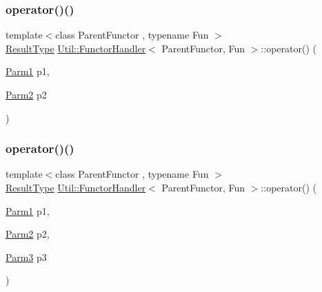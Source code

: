 \mbox{\label{classUtil_1_1FunctorHandler_a464269162477cf2b95690d94ec3fa02c}} 
\subsubsection{\texorpdfstring{operator()()}{operator()()}\hspace{0.1cm}{\footnotesize\ttfamily [9/18]}}
{\footnotesize\ttfamily template$<$class Parent\+Functor , typename Fun $>$ \\
\mbox{\hyperlink{classUtil_1_1FunctorHandler_a036da44b8cc2567704cebd2a20d16c80}{Result\+Type}} \mbox{\hyperlink{classUtil_1_1FunctorHandler}{Util\+::\+Functor\+Handler}}$<$ Parent\+Functor, Fun $>$\+::operator() (\begin{DoxyParamCaption}\item[{\mbox{\hyperlink{classUtil_1_1FunctorHandler_a0a902ba40a0ab746f1c29a81d68ae0db}{Parm1}}}]{p1,  }\item[{\mbox{\hyperlink{classUtil_1_1FunctorHandler_a5fb5374c316f8ac252aa22fcdf7d21a7}{Parm2}}}]{p2 }\end{DoxyParamCaption})\hspace{0.3cm}{\ttfamily [inline]}}

\mbox{\label{classUtil_1_1FunctorHandler_a7f8257ee5864ceec038116184231eb63}} 
\subsubsection{\texorpdfstring{operator()()}{operator()()}\hspace{0.1cm}{\footnotesize\ttfamily [10/18]}}
{\footnotesize\ttfamily template$<$class Parent\+Functor , typename Fun $>$ \\
\mbox{\hyperlink{classUtil_1_1FunctorHandler_a036da44b8cc2567704cebd2a20d16c80}{Result\+Type}} \mbox{\hyperlink{classUtil_1_1FunctorHandler}{Util\+::\+Functor\+Handler}}$<$ Parent\+Functor, Fun $>$\+::operator() (\begin{DoxyParamCaption}\item[{\mbox{\hyperlink{classUtil_1_1FunctorHandler_a0a902ba40a0ab746f1c29a81d68ae0db}{Parm1}}}]{p1,  }\item[{\mbox{\hyperlink{classUtil_1_1FunctorHandler_a5fb5374c316f8ac252aa22fcdf7d21a7}{Parm2}}}]{p2,  }\item[{\mbox{\hyperlink{classUtil_1_1FunctorHandler_a25f1b9dd7890c1dbc68abc686f30bec8}{Parm3}}}]{p3 }\end{DoxyParamCaption})\hspace{0.3cm}{\ttfamily [inline]}}

